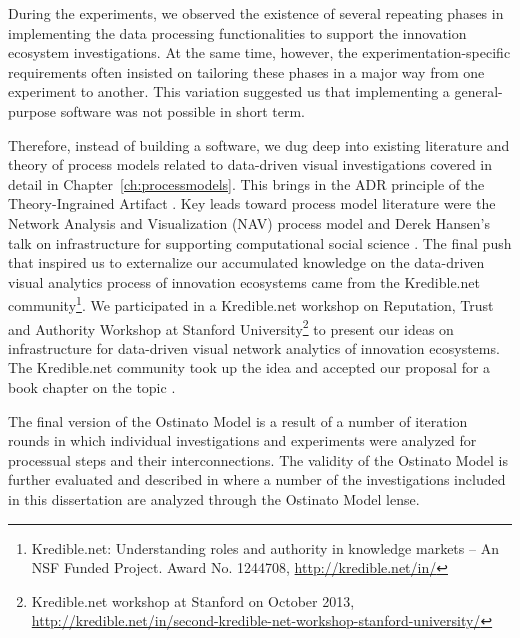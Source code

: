 During the experiments, we observed the existence of several repeating phases in implementing the data processing functionalities to support the innovation ecosystem investigations. At the same time, however, the experimentation-specific requirements often insisted on tailoring these phases in a major way from one experiment to another. This variation suggested us that implementing a general-purpose software was not possible in short term.

Therefore, instead of building a software, we dug deep into existing literature and theory of process models related to data-driven visual investigations covered in detail in Chapter~\ref{ch:processmodels}. This brings in the ADR principle of the Theory-Ingrained Artifact \citep{Sein2011ActionResearch}. Key leads toward process model literature were the Network Analysis and Visualization (NAV) process model \citep{Hansen2012DoData} and Derek Hansen's talk on infrastructure for supporting computational social science \citep{Hansen2013InfrastructureScience}. The final push that inspired us to externalize our accumulated knowledge on the data-driven visual analytics process of innovation ecosystems came from the Kredible.net community\footnote{Kredible.net: Understanding roles and authority in knowledge markets – An NSF Funded Project. Award No. 1244708, \url{http://kredible.net/in/}}. We participated in a Kredible.net workshop on Reputation, Trust and Authority Workshop at Stanford University\footnote{Kredible.net workshop at Stanford on October 2013, \url{http://kredible.net/in/second-kredible-net-workshop-stanford-university/}} to present our ideas on infrastructure for data-driven visual network analytics of innovation ecosystems. The Kredible.net community took up the idea and accepted our proposal for a book chapter on the topic \citep{Huhtamaki2015Ostinato:Analytics}.

The final version of the Ostinato Model is a result of a number of iteration rounds in which individual investigations and experiments were analyzed for processual steps and their interconnections. The validity of the Ostinato Model is further evaluated and described in \cite{Huhtamaki2017ProcessingExperiences} where a number of the investigations included in this dissertation are analyzed through the Ostinato Model lense.


